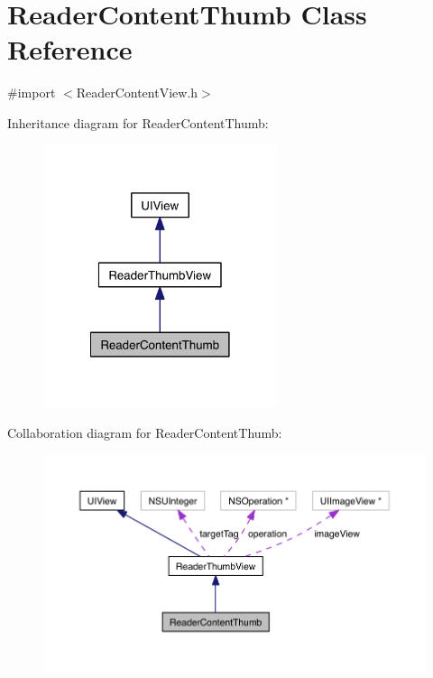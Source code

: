 \hypertarget{interface_reader_content_thumb}{\section{Reader\-Content\-Thumb Class Reference}
\label{d4/df0/interface_reader_content_thumb}
}


{\ttfamily \#import $<$Reader\-Content\-View.\-h$>$}



Inheritance diagram for Reader\-Content\-Thumb\-:
\nopagebreak
\begin{figure}[H]
\begin{center}
\leavevmode
\includegraphics[width=194pt]{da/d5f/interface_reader_content_thumb__inherit__graph}
\end{center}
\end{figure}


Collaboration diagram for Reader\-Content\-Thumb\-:
\nopagebreak
\begin{figure}[H]
\begin{center}
\leavevmode
\includegraphics[width=350pt]{d0/d3f/interface_reader_content_thumb__coll__graph}
\end{center}
\end{figure}
